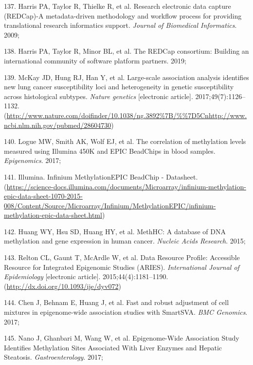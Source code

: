 \documentclass[11pt,oneside]{bristolthesis}
\newenvironment{cslreferences}%
  {}%
  {\par}
\begin{document}
\begin{cslreferences}
\leavevmode\hypertarget{ref-Harris2009}{}%
137. Harris PA, Taylor R, Thielke R, et al. Research electronic data capture (REDCap)-A metadata-driven methodology and workflow process for providing translational research informatics support. \emph{Journal of Biomedical Informatics}. 2009;

\leavevmode\hypertarget{ref-Harris2019}{}%
138. Harris PA, Taylor R, Minor BL, et al. The REDCap consortium: Building an international community of software platform partners. 2019;

\leavevmode\hypertarget{ref-McKay2017}{}%
139. McKay JD, Hung RJ, Han Y, et al. Large-scale association analysis identifies new lung cancer susceptibility loci and heterogeneity in genetic susceptibility across histological subtypes. \emph{Nature genetics} {[}electronic article{]}. 2017;49(7):1126--1132. (\url{http://www.nature.com/doifinder/10.1038/ng.3892\%7B/\%\%7D5Cnhttp://www.ncbi.nlm.nih.gov/pubmed/28604730})

\leavevmode\hypertarget{ref-Logue2017}{}%
140. Logue MW, Smith AK, Wolf EJ, et al. The correlation of methylation levels measured using Illumina 450K and EPIC BeadChips in blood samples. \emph{Epigenomics}. 2017;

\leavevmode\hypertarget{ref-IlluminaEPIC}{}%
141. Illumina. Infinium MethylationEPIC BeadChip - Datasheet. (\url{https://science-docs.illumina.com/documents/Microarray/infinium-methylation-epic-data-sheet-1070-2015-008/Content/Source/Microarray/Infinium/MethylationEPIC/infinium-methylation-epic-data-sheet.html})

\leavevmode\hypertarget{ref-Huang2015}{}%
142. Huang WY, Hsu SD, Huang HY, et al. MethHC: A database of DNA methylation and gene expression in human cancer. \emph{Nucleic Acids Research}. 2015;

\leavevmode\hypertarget{ref-Relton2015-aries}{}%
143. Relton CL, Gaunt T, McArdle W, et al. Data Resource Profile: Accessible Resource for Integrated Epigenomic Studies (ARIES). \emph{International Journal of Epidemiology} {[}electronic article{]}. 2015;44(4):1181--1190. (\url{http://dx.doi.org/10.1093/ije/dyv072})

\leavevmode\hypertarget{ref-Chen2017}{}%
144. Chen J, Behnam E, Huang J, et al. Fast and robust adjustment of cell mixtures in epigenome-wide association studies with SmartSVA. \emph{BMC Genomics}. 2017;

\leavevmode\hypertarget{ref-Nano2017}{}%
145. Nano J, Ghanbari M, Wang W, et al. Epigenome-Wide Association Study Identifies Methylation Sites Associated With Liver Enzymes and Hepatic Steatosis. \emph{Gastroenterology}. 2017;


\end{cslreferences}
\end{document}
